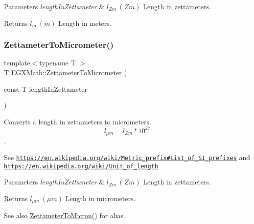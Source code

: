 \begin{DoxyParams}{Parameters}
{\em length\+In\+Zettameter} & $ l_{Zm}\ (Zm)$ Length in zettameters. \\
\hline
\end{DoxyParams}
\begin{DoxyReturn}{Returns}
$ l_{m}\ (m)$ Length in meters. 
\end{DoxyReturn}
\mbox{\label{group___e_g_x_math-_conversions-_length_conversions-_zettameter-_s_i_ga495f68a50945d994b3f2d455b3348595}} 
\subsubsection{\texorpdfstring{Zettameter\+To\+Micrometer()}{ZettameterToMicrometer()}}
{\footnotesize\ttfamily template$<$typename T $>$ \\
T E\+G\+X\+Math\+::\+Zettameter\+To\+Micrometer (\begin{DoxyParamCaption}\item[{const T}]{length\+In\+Zettameter }\end{DoxyParamCaption})}



Converts a length in zettameters to micrometers. \[ l_{\mu m}=l_{Zm} * 10^{27} \]. 

See \href{https://en.wikipedia.org/wiki/Metric_prefix#List_of_SI_prefixes}{\tt https\+://en.\+wikipedia.\+org/wiki/\+Metric\+\_\+prefix\#\+List\+\_\+of\+\_\+\+S\+I\+\_\+prefixes} and \href{https://en.wikipedia.org/wiki/Unit_of_length}{\tt https\+://en.\+wikipedia.\+org/wiki/\+Unit\+\_\+of\+\_\+length} 
\begin{DoxyParams}{Parameters}
{\em length\+In\+Zettameter} & $ l_{Zm}\ (Zm)$ Length in zettameters. \\
\hline
\end{DoxyParams}
\begin{DoxyReturn}{Returns}
$ l_{\mu m}\ (\mu m)$ Length in micrometers. 
\end{DoxyReturn}
\begin{DoxySeeAlso}{See also}
\mbox{\hyperlink{group___e_g_x_math-_conversions-_length_conversions-_zettameter-_non-_s_i_gafede369c63111d97f92238e626cdfa87}{Zettameter\+To\+Micron()}} for alias. 
\end{DoxySeeAlso}
\mbox{\label{group___e_g_x_math-_conversions-_length_conversions-_zettameter-_s_i_ga0a4789d57f14de64a2a3579745c7c5b5}} 
